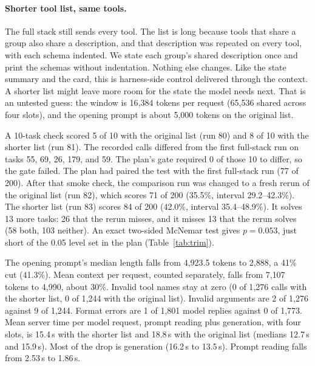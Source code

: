 \documentclass[11pt]{article}
\begin{document}
\paragraph{Shorter tool list, same tools.}
The full stack still sends every tool. The list is long because tools that share a group also share a description, and that description was repeated on every tool, with each schema indented. We state each group's shared description once and print the schemas without indentation. Nothing else changes. Like the state summary and the card, this is harness-side control delivered through the context. A shorter list might leave more room for the state the model needs next. That is an untested guess: the window is 16{,}384 tokens per request (65{,}536 shared across four slots), and the opening prompt is about 5{,}000 tokens on the original list.

A 10-task check scored 5 of 10 with the original list (run 80) and 8 of 10 with the shorter list (run 81). The recorded calls differed from the first full-stack run on tasks 55, 69, 26, 179, and 59. The plan's gate required 0 of those 10 to differ, so the gate failed. The plan had paired the test with the first full-stack run (77 of 200). After that smoke check, the comparison run was changed to a fresh rerun of the original list (run 82), which scores 71 of 200 (35.5\%, interval 29.2--42.3\%). The shorter list (run 83) scores 84 of 200 (42.0\%, interval 35.4--48.9\%). It solves 13 more tasks: 26 that the rerun misses, and it misses 13 that the rerun solves (58 both, 103 neither). An exact two-sided McNemar test gives $p=0.053$, just short of the 0.05 level set in the plan (Table~\ref{tab:trim}).

The opening prompt's median length falls from 4{,}923.5 tokens to 2{,}888, a 41\% cut (41.3\%). Mean context per request, counted separately, falls from 7{,}107 tokens to 4{,}990, about 30\%. Invalid tool names stay at zero (0 of 1{,}276 calls with the shorter list, 0 of 1{,}244 with the original list). Invalid arguments are 2 of 1{,}276 against 9 of 1{,}244. Format errors are 1 of 1{,}801 model replies against 0 of 1{,}773. Mean server time per model request, prompt reading plus generation, with four slots, is 15.4\,s with the shorter list and 18.8\,s with the original list (medians 12.7\,s and 15.9\,s). Most of the drop is generation (16.2\,s to 13.5\,s). Prompt reading falls from 2.53\,s to 1.86\,s.
\end{document}
